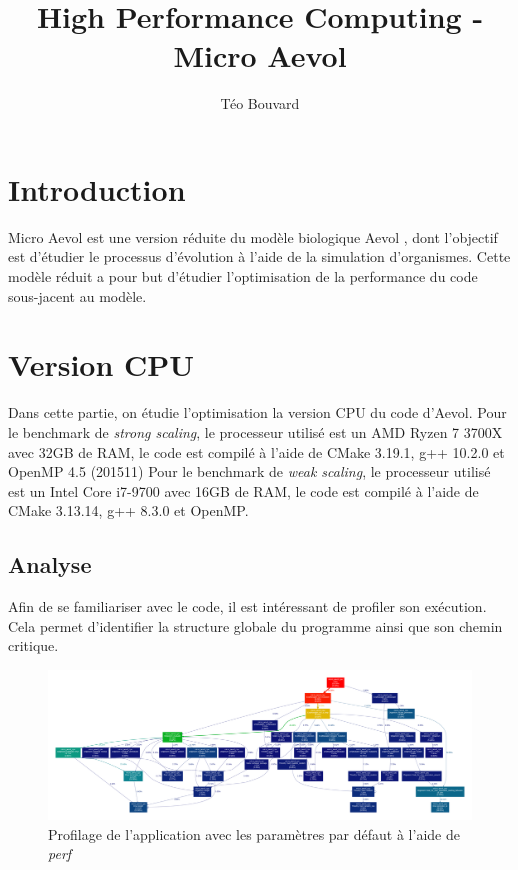 \documentclass[a4paper, 10pt, twoside]{article}
\begin{document}
\title{High Performance Computing - Micro Aevol}
\author{T\'eo Bouvard}
\maketitle

\section{Introduction}

Micro Aevol est une version réduite du modèle biologique Aevol \cite{aevol}, dont l'objectif est d'étudier le processus d'évolution à l'aide de la simulation d'organismes. Cette modèle réduit a pour but d'étudier l'optimisation de la performance du code sous-jacent au modèle.

\section{Version CPU}

Dans cette partie, on étudie l'optimisation la version CPU du code d'Aevol.
Pour le benchmark de \textit{strong scaling}, le processeur utilisé est un AMD Ryzen 7 3700X avec 32GB de RAM, le code est compilé à l'aide de CMake 3.19.1, g++ 10.2.0 et OpenMP 4.5 (201511)
Pour le benchmark de \textit{weak scaling}, le processeur utilisé est un Intel Core i7-9700 avec 16GB de RAM, le code est compilé à l'aide de CMake 3.13.14, g++ 8.3.0 et OpenMP.

\subsection{Analyse}

Afin de se familiariser avec le code, il est intéressant de profiler son exécution. Cela permet d'identifier la structure globale du programme ainsi que son chemin critique.

\begin{figure}[htpb]
	\includegraphics[width=\linewidth]{img/profile_aevol.pdf}
	\caption{Profilage de l'application avec les paramètres par défaut à l'aide de \textit{perf}}
\end{figure}
\end{document}
